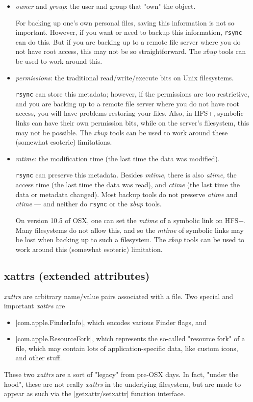 \documentclass[11pt]{article}
\begin{document}
\begin{itemize}
\item
\emph{owner} and \emph{group}:  the user and group that "own" the
object.

For backing up one's own personal files, 
saving this information is not so important.
However, if you want or need to backup this information,
\texttt{rsync} can do this.
But if you are backing up to a remote file server where
you do not have root access, this may not be so straightforward.
The \emph{xbup} tools can be used to work around this.

\item
\emph{permissions}: the traditional read/write/execute bits
on Unix filesystems.

\texttt{rsync} can store this metadata;
however, if the permissions are too restrictive, 
and you are backing up to a remote file server
where you do not have root access,
you will have problems restoring your files.
Also, in HFS+, symbolic links can have their own permission bits,
while on the server's filesystem, this may not be possible.
The \emph{xbup} tools can be used to work around these (somewhat esoteric)
limitations.

\item
\emph{mtime}: the modification time (the last time the data was modified).

\texttt{rsync} can preserve this metadata.
Besides \emph{mtime}, there is also \emph{atime},
the access time (the last time the data 
was read),
and \emph{ctime} (the last time the data or metadata changed).
Most backup tools do not preserve \emph{atime} and \emph{ctime} ---
and neither do \texttt{rsync} or the \emph{xbup} tools.

On version 10.5 of OSX, one can set the \emph{mtime} of a symbolic link on HFS+.
Many filesystems do not allow this, and so the \emph{mtime}
of symbolic links may be lost when backing up to such a filesystem.
The \emph{xbup} tools can be used to work around this (somewhat esoteric)
limitation.


\end{itemize}

\subsection{xattrs (extended attributes)}

\emph{xattrs}
are arbitrary name/value pairs associated with a file.
Two special and important \emph{xattrs} are
\begin{itemize}
\item
      |com.apple.FinderInfo|, which encodes various Finder flags,
and
\item
      |com.apple.ResourceFork|,
which represents the so-called "resource fork" of a file,
                                which may contain lots of application-specific
                                data, like custom icons, and other stuff.
\end{itemize}
These two \emph{xattrs} are a sort of "legacy" from pre-OSX days.
   In fact, "under the hood", these are not really \emph{xattrs} in the
   underlying filesystem, but are made to appear as such via the
   |getxattr/setxattr| function interface.
\end{document}
